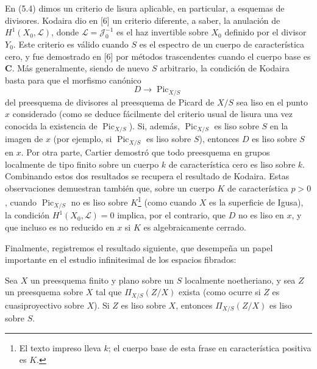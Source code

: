 En (5.4) dimos un criterio de lisura aplicable, en particular, a esquemas de
divisores. Kodaira dio en [6] un criterio diferente, a saber, la anulación de
$H^1(X_0,\mathcal L)$, donde $\mathcal L=\mathcal J_0^{-1}$ es el haz
invertible sobre $X_0$ definido por el divisor $Y_0$. Este criterio es válido
cuando $S$ es el espectro de un cuerpo de característica cero, y fue demostrado
en [6] por métodos trascendentes cuando el cuerpo base es $\mathbf C$. Más
generalmente, siendo de nuevo $S$ arbitrario, la condición de Kodaira basta
para que el morfismo canónico
\[
D\longrightarrow\operatorname{Pic}_{X/S}
\]
del preesquema de divisores al preesquema de Picard de $X/S$ sea liso en el
punto $x$ considerado (como se deduce fácilmente del criterio usual de lisura
una vez conocida la existencia de $\operatorname{Pic}_{X/S}$). Si, además,
$\operatorname{Pic}_{X/S}$ es liso sobre $S$ en la imagen de $x$ (por ejemplo,
si $\operatorname{Pic}_{X/S}$ es liso sobre $S$), entonces $D$ es liso sobre
$S$ en $x$. Por otra parte, Cartier demostró que todo preesquema en grupos
localmente de tipo finito sobre un cuerpo $k$ de característica cero es liso
sobre $k$. Combinando estos dos resultados se recupera el resultado de
Kodaira. Estas observaciones demuestran también que, sobre un cuerpo $K$ de
característica $p>0$, cuando $\operatorname{Pic}_{X/S}$ no es liso sobre $K$\footnote{El texto impreso lleva $k$; el cuerpo base de esta frase en característica positiva es $K$.}
(como cuando $X$ es la superficie de Igusa), la condición
$H^1(X_0,\mathcal L)=0$ implica, por el contrario, que $D$ no es liso en $x$,
y que incluso es no reducido en $x$ si $K$ es algebraicamente cerrado.

Finalmente, registremos el resultado siguiente, que desempeña un papel
importante en el estudio infinitesimal de los espacios fibrados:

 Sea $X$ un preesquema finito y plano sobre un $S$
localmente noetheriano, y sea $Z$ un preesquema sobre $X$ tal que
$\Pi_{X/S}(Z/X)$ exista (como ocurre si $Z$ es cuasiproyectivo sobre $X$). Si
$Z$ es liso sobre $X$, entonces $\Pi_{X/S}(Z/X)$ es liso sobre $S$.

